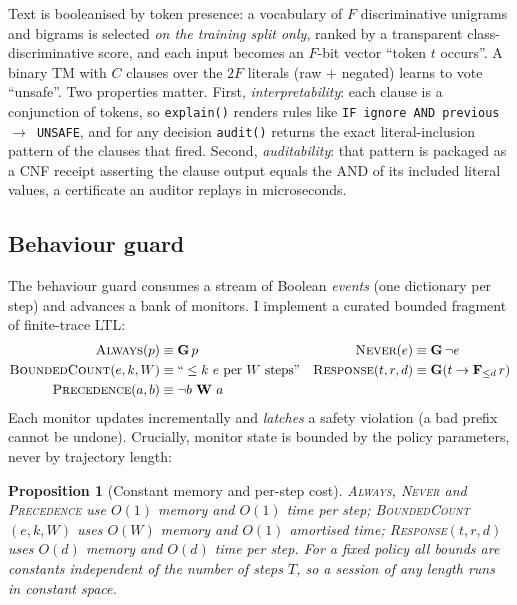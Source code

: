 \documentclass[11pt]{article}
\newtheorem{proposition}{Proposition}
\begin{document}
Text is booleanised by token presence: a vocabulary of $F$ discriminative
unigrams and bigrams is selected \emph{on the training split only}, ranked by a
transparent class-discriminative score, and each input becomes an $F$-bit vector
``token $t$ occurs''. A binary TM with $C$ clauses over the $2F$ literals
(raw $+$ negated) learns to vote ``unsafe''. Two properties matter. First,
\emph{interpretability}: each clause is a conjunction of tokens, so
\texttt{explain()} renders rules like \texttt{IF ignore AND previous
$\rightarrow$ UNSAFE}, and for any decision \texttt{audit()} returns the exact
literal-inclusion pattern of the clauses that fired. Second, \emph{auditability}:
that pattern is packaged as a CNF receipt asserting the clause output equals the
AND of its included literal values, a certificate an auditor replays in
microseconds.

\subsection{Behaviour guard}
\label{sec:behavior}

The behaviour guard consumes a stream of Boolean \emph{events} (one dictionary
per step) and advances a bank of monitors. I implement a curated bounded
fragment of finite-trace LTL:
\begin{align*}
\textsc{Always}(p) &\equiv \mathbf{G}\,p &
\textsc{Never}(e) &\equiv \mathbf{G}\,\neg e \\
\textsc{BoundedCount}(e,k,W) &\equiv \text{``}\le k\ e\text{ per }W\text{ steps''} &
\textsc{Response}(t,r,d) &\equiv \mathbf{G}(t \rightarrow \mathbf{F}_{\le d}\,r)\\
\textsc{Precedence}(a,b) &\equiv \neg b\ \mathbf{W}\ a &&
\end{align*}
Each monitor updates incrementally and \emph{latches} a safety violation (a bad
prefix cannot be undone). Crucially, monitor state is bounded by the policy
parameters, never by trajectory length:

\begin{proposition}[Constant memory and per-step cost]
\label{prop:memory}
\textsc{Always}, \textsc{Never} and \textsc{Precedence} use $O(1)$ memory and
$O(1)$ time per step; \textsc{BoundedCount}$(e,k,W)$ uses $O(W)$ memory and $O(1)$
amortised time; \textsc{Response}$(t,r,d)$ uses $O(d)$ memory and $O(d)$ time per
step. For a fixed policy all bounds are constants independent of the number of
steps $T$, so a session of any length runs in constant space.
\end{proposition}
\end{document}
